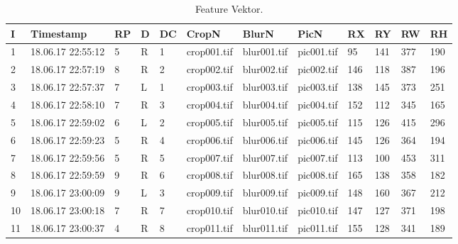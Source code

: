 \setlength\tabcolsep{5pt}

\begin{table}[H]
\centering
\begin{tabular}{|l|l|l|l|l|l|l|l|l|l|l|l|}
\hline
\textbf{I} & \textbf{Timestamp}  & \textbf{RP} & \textbf{D} & \textbf{DC} & \textbf{CropN} & \textbf{BlurN} & \textbf{PicN} & \textbf{RX} & \textbf{RY} & \textbf{RW} & \textbf{RH} \\ \hline
1            & 18.06.17 22:55:12 & 5           & R            & 1           & crop001.tif       & blur001.tif       & pic001.tif       & 95          & 141         & 377         & 190         \\ \hline
2            & 18.06.17 22:57:19 & 8           & R            & 2           & crop002.tif       & blur002.tif       & pic002.tif       & 146         & 118         & 387         & 196         \\ \hline
3            & 18.06.17 22:57:37 & 7          & L            & 1           & crop003.tif       & blur003.tif       & pic003.tif       & 138         & 145         & 373         & 251         \\ \hline
4            & 18.06.17 22:58:10 & 7           & R            & 3           & crop004.tif       & blur004.tif       & pic004.tif       & 152         & 112         & 345         & 165         \\ \hline
5            & 18.06.17 22:59:02 & 6           & L            & 2           & crop005.tif       & blur005.tif       & pic005.tif       & 115         & 126         & 415         & 296         \\ \hline
6            & 18.06.17 22:59:23 & 5           & R            & 4           & crop006.tif       & blur006.tif       & pic006.tif       & 145         & 126         & 364         & 194         \\ \hline
7            & 18.06.17 22:59:56 & 5          & R            & 5           & crop007.tif       & blur007.tif       & pic007.tif       & 113         & 100         & 453         & 311         \\ \hline
8            & 18.06.17 22:59:59 & 9           & R            & 6           & crop008.tif       & blur008.tif       & pic008.tif       & 165         & 138         & 358         & 182         \\ \hline
9            & 18.06.17 23:00:09 & 9           & L            & 3           & crop009.tif       & blur009.tif       & pic009.tif       & 148         & 160         & 367         & 212         \\ \hline
10           & 18.06.17 23:00:18 & 7           & R            & 7           & crop010.tif       & blur010.tif       & pic010.tif       & 147         & 127         & 371         & 198         \\ \hline
11           & 18.06.17 23:00:37 & 4           & R            & 8           & crop011.tif       & blur011.tif       & pic011.tif       & 155         & 128         & 341         & 189         \\ \hline
\end{tabular}
\caption{Feature Vektor.}
\label{tFeatureVektor}
\end{table}

